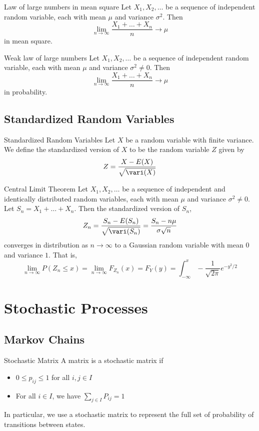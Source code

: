 \documentclass[a4paper]{article}
\begin{document}
\begin{thm}{Law of large numbers in mean square}{} Let $X_1,X_2,\dots$ be a sequence of independent random variable, each with mean $\mu$ and variance $\sigma^2$. Then $$\lim_{n\to\infty}\frac{X_1+\dots+X_n}{n}\to\mu$$ in mean square. 
\end{thm}

\begin{thm}{Weak law of large numbers}{} Let $X_1,X_2,\dots$ be a sequence of independent random variable, each with mean $\mu$ and variance $\sigma^2\neq 0$. Then $$\lim_{n\to\infty}\frac{X_1+\dots+X_n}{n}\to\mu$$ in probability. 
\end{thm}

\subsection{Standardized Random Variables}
\begin{defn}{Standardized Random Variables}{} Let $X$ be a random variable with finite variance. We define the standardized version of $X$ to be the random variable $Z$ given by $$Z=\frac{X-E(X)}{\sqrt{\vari(X)}}$$
\end{defn}

\begin{thm}{Central Limit Theorem}{} Let $X_1,X_2,\dots$ be a sequence of independent and identically distributed random variables, each with mean $\mu$ and variance $\sigma^2\neq 0$. Let $S_n=X_1+\dots+X_n$. Then the standardized version of $S_n$, $$Z_n=\frac{S_n-E(S_n)}{\sqrt{\vari(S_n)}}=\frac{S_n-n\mu}{\sigma\sqrt{n}}$$ converges in distribution as $n\to\infty$ to a Gaussian random variable with mean $0$ and variance $1$. That is, $$\lim_{n\to\infty}P(Z_n\leq x)=\lim_{n\to\infty}F_{Z_n}(x)=F_Y(y)=\int_{-\infty}^{x}-\frac{1}{\sqrt{2\pi}}e^{-y^2/2}$$
\end{thm}

\pagebreak
\section{Stochastic Processes}
\subsection{Markov Chains}
\begin{defn}{Stochastic Matrix}{} A matrix is a stochastic matrix if 
\begin{itemize}
\item $0\leq p_{ij}\leq 1$ for all $i,j\in I$
\item For all $i\in I$, we have $\sum_{j\in I}P_{ij}=1$
\end{itemize}
In particular, we use a stochastic matrix to represent the full set of probability of transitions between states. 
\end{defn}
\end{document}
